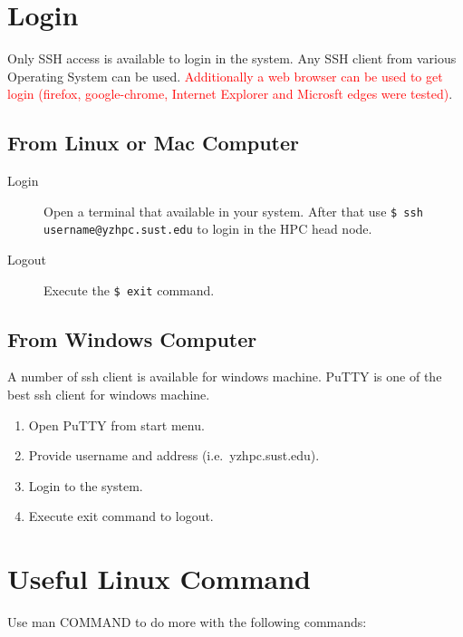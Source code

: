 \documentclass{book}
\begin{document}
\section{Login}%
\label{sec:login}

Only SSH access is available to login in the system. Any SSH client from various Operating System can be used. \textcolor{red}{Additionally a web browser can be used to get login (firefox, google-chrome, Internet Explorer and Microsft edges were tested)}.

\subsection{From Linux or Mac Computer}%
\label{sub:from_linux_or_mac}

\begin{description}
	\item[Login] Open a terminal that available in your system. After that use \texttt{\$ ssh username@yzhpc.sust.edu} to login in the HPC head node.
	\item[Logout] Execute the \texttt{\$ exit} command.
\end{description}

\subsection{From Windows Computer}%
\label{sub:from_windows_computer}

A number of ssh client is available for windows machine. PuTTY is one of the best ssh client for windows machine.

\begin{enumerate}
	\item Open PuTTY from start menu.
	\item Provide username and address (i.e.\ yzhpc.sust.edu).
	\item Login to the system.
	\item Execute exit command to logout.
\end{enumerate}

\section{Useful Linux Command}%
\label{sec:useful_linux_command}

Use man COMMAND to do more with the following commands:
\end{document}
